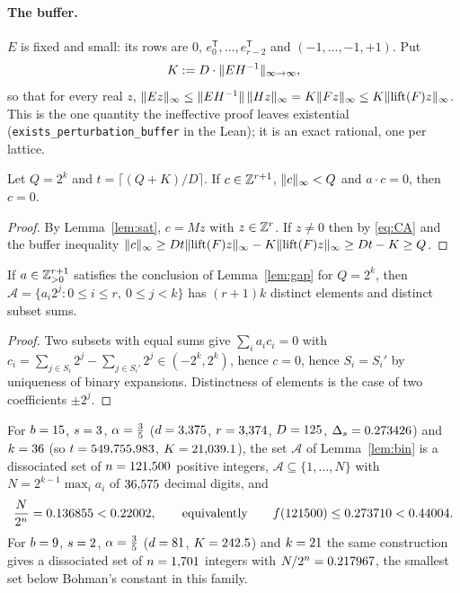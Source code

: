 \documentclass[11pt]{article}
\newcommand{\lift}{\operatorname{lift}}
\begin{document}
\paragraph{The buffer.} $E$ is fixed and small: its rows are $0$, $e_0^{\mathsf T},\dots,e_{r-2}^{\mathsf T}$
and $(-1,\dots,-1,+1)$. Put
\[
K:=D\cdot\lVert EH^{-1} \rVert_{\infty\to\infty},
\]
so that for every real $z$,
$\norm{Ez}_\infty\le\norm{EH^{-1}}\,\norm{Hz}_\infty=K\norm{Fz}_\infty\le K\norm{\lift(F)z}_\infty$.
This is the one quantity the ineffective proof leaves existential (\texttt{exists\_perturbation\_buffer} in the Lean); it is an exact rational, one per lattice.

\begin{lemma}\label{lem:gap}
Let $Q=2^k$ and $t=\lceil(Q+K)/D\rceil$. If $c\in\mathbb{Z}^{r+1}$, $\lVert c \rVert_\infty<Q$ and $a\cdot c=0$, then $c=0$.
\end{lemma}

\begin{proof}
By Lemma~\ref{lem:sat}, $c=Mz$ with $z\in\mathbb{Z}^r$. If $z\ne0$ then by \eqref{eq:CA} and the buffer
inequality
$\norm c_\infty\ge Dt\norm{\lift(F)z}_\infty-K\norm{\lift(F)z}_\infty\ge Dt-K\ge Q$.
\end{proof}

\begin{lemma}\label{lem:bin}
If $a\in\mathbb{Z}_{>0}^{r+1}$ satisfies the conclusion of Lemma~\ref{lem:gap} for $Q=2^k$, then
$\mathcal A=\{a_i2^j:0\le i\le r,\ 0\le j<k\}$ has $(r+1)k$ distinct elements and distinct subset sums.
\end{lemma}

\begin{proof}
Two subsets with equal sums give $\sum_ia_ic_i=0$ with
$c_i=\sum_{j\in S_i}2^j-\sum_{j\in S_i'}2^j\in(-2^k,2^k)$, hence $c=0$, hence $S_i=S_i'$ by
uniqueness of binary expansions. Distinctness of elements is the case of two coefficients $\pm2^j$.
\end{proof}

\begin{theorem}\label{thm:main}
For $b=15$, $s=3$, $\alpha=\tfrac{3}{5}$ ($d=3{,}375$, $r=3{,}374$, $D=125$, $\Delta_s=0.273426$) and
$k=36$ (so $t=549{,}755{,}983$, $K=21{,}039.1$), the set $\mathcal A$ of Lemma~\ref{lem:bin} is a
dissociated set of $n=121{,}500$ positive integers, $\mathcal A\subseteq\{1,\dots,N\}$ with
$N=2^{k-1}\max_ia_i$ of $36{,}575$ decimal digits, and
\[
\frac{N}{2^{n}}=0.136855<0.22002,\qquad\text{equivalently}\qquad f(121500)\le0.273710<0.44004 .
\]
For $b=9$, $s=2$, $\alpha=\tfrac{3}{5}$ ($d=81$, $K=242.5$) and $k=21$ the same construction gives a dissociated set of
$n=1{,}701$ integers with $N/2^n=0.217967$, the smallest set below Bohman's constant in this family.
\end{theorem}
\end{document}
